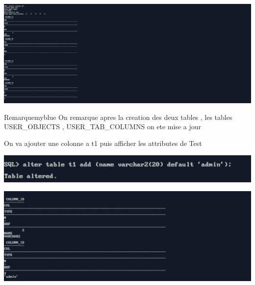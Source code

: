 

\begin{center}
    \includegraphics[width=\textwidth]{ScreenShot/Partie5/testatt2.png}
\end{center}

\begin{prettyBox}{Remarque}{myblue}
On remarque apres la creation des deux tables , les tables USER\_OBJECTS , USER\_TAB\_COLUMNS on ete mise a jour
\end{prettyBox}

\vspace{0.25cm}
On va ajouter une colonne a t1 puis afficher les attributes de Test



\begin{center}
    \includegraphics[width=\textwidth]{ScreenShot/Partie5/col.png}
\end{center}



\begin{center}
    \includegraphics[width=\textwidth]{ScreenShot/Partie5/testatt3.png}
\end{center}

